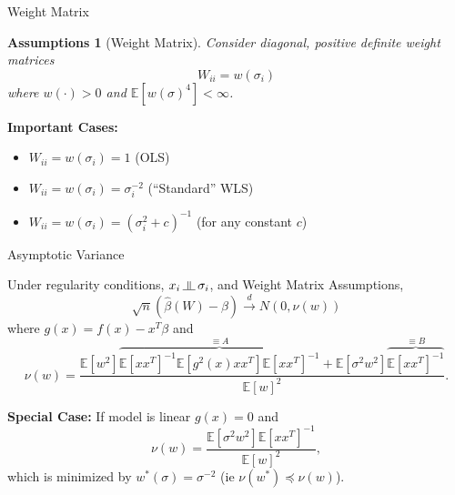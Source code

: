 \documentclass[12pt]{beamer}
\newcommand{\E}{\mathbb{E}}
\newcommand{\rightarrowd}{\overset{d}{\to}}
\newcommand{\indep}{\rotatebox[origin=c]{90}{$\models$}}
\newtheorem{assumptions}{Assumptions}
\begin{document}
\begin{frame}{Weight Matrix}

  \begin{assumptions}[Weight Matrix]
  Consider diagonal, positive definite weight matrices
  \begin{equation*}
    W_{ii} = w(\sigma_i)
  \end{equation*}
  where $w(\cdot) > 0$ and $\E[w(\sigma)^4] < \infty$.
  \end{assumptions}

  \vspace{.2in}
  
  \textbf{Important Cases:}
  \begin{itemize}
  \item $W_{ii} = w(\sigma_{i}) = 1$ (OLS)
  \item $W_{ii} = w(\sigma_{i}) = \sigma_{i}^{-2}$ (``Standard'' WLS)
  \item $W_{ii} = w(\sigma_{i}) = (\sigma_{i}^{2} + c)^{-1}$ (for any constant $c$)
  \end{itemize}
\end{frame}

\begin{frame}{Asymptotic Variance}

  \vspace{-.05in}
  
  \begin{theorem}
    Under regularity conditions, $x_i \, \indep \, \sigma_i$, and Weight Matrix Assumptions,
  \begin{equation*}
    \sqrt{n}(\widehat{\beta}(W) - \beta) \rightarrowd N(0,\nu(w))
  \end{equation*}
  where $g(x) = f(x) - x^T\beta$ and
  \begin{equation*}
    \nu(w) = \frac{\E[w^2]\overbrace{\E[xx^T]^{-1}\E[g^2(x)xx^T]\E[xx^T]^{-1}}^{\equiv A} + \E[\sigma^2w^2]\overbrace{\E[xx^T]^{-1}}^{\equiv B}}{\E[w]^2}.
  \end{equation*}
  \end{theorem}

  \vspace{-.05in}
  
  \textbf{Special Case:}
   If model is linear $g(x)=0$ and
    \begin{equation*}
      \nu(w) = \frac{\E[\sigma^2w^2]\E[xx^T]^{-1}}{\E[w]^2},
    \end{equation*}
   which is minimized by $w^*(\sigma) = \sigma^{-2}$ (ie $\nu(w^*) \preceq \nu(w)$).
  
\end{frame}
\end{document}
